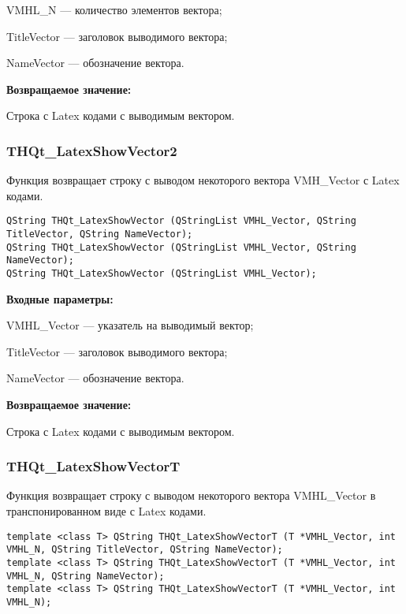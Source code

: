 \documentclass[a4paper,12pt]{article}
\begin{document}
    VMHL\_N --- количество элементов вектора;
 
    TitleVector --- заголовок выводимого вектора;
 
    NameVector --- обозначение вектора.
	
\textbf{Возвращаемое значение:}

Строка с Latex кодами с выводимым вектором.


\subsubsection{THQt\_LatexShowVector2}\label{THQt_LatexShowVector2}

Функция возвращает строку с выводом некоторого вектора VMH\_Vector с Latex кодами.


\begin{lstlisting}[label=code_syntax_THQt_LatexShowVector2,caption=Синтаксис]
QString THQt_LatexShowVector (QStringList VMHL_Vector, QString TitleVector, QString NameVector);
QString THQt_LatexShowVector (QStringList VMHL_Vector, QString NameVector);
QString THQt_LatexShowVector (QStringList VMHL_Vector);
\end{lstlisting}

\textbf{Входные параметры:}
 
    VMHL\_Vector --- указатель на выводимый вектор;
 
    TitleVector --- заголовок выводимого вектора;
 
    NameVector --- обозначение вектора.
	
\textbf{Возвращаемое значение:}

Строка с Latex кодами с выводимым вектором.


\subsubsection{THQt\_LatexShowVectorT}\label{THQt_LatexShowVectorT}

Функция возвращает строку с выводом некоторого вектора VMHL\_Vector в транспонированном виде с Latex кодами.


\begin{lstlisting}[label=code_syntax_THQt_LatexShowVectorT,caption=Синтаксис]
template <class T> QString THQt_LatexShowVectorT (T *VMHL_Vector, int VMHL_N, QString TitleVector, QString NameVector);
template <class T> QString THQt_LatexShowVectorT (T *VMHL_Vector, int VMHL_N, QString NameVector);
template <class T> QString THQt_LatexShowVectorT (T *VMHL_Vector, int VMHL_N);
\end{lstlisting}
\end{document}
